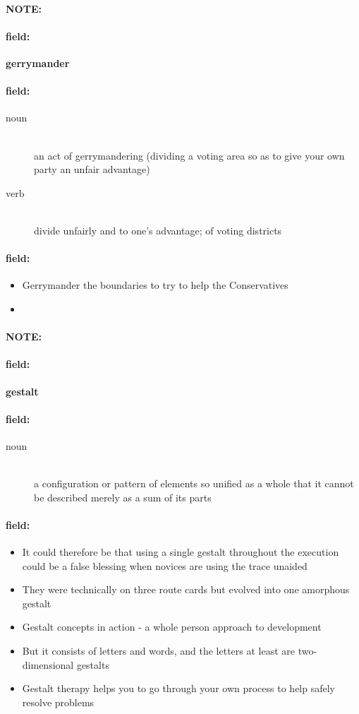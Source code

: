 \documentclass[12pt]{article}
\newenvironment{note}{\paragraph{NOTE:}}{}
\newenvironment{field}{\paragraph{field:}}{}
\begin{document}
\begin{note}
\begin{field}
\textbf{\large gerrymander}
\end{field}


\begin{field}
\begin{description}
\item[noun] \hfill \\ 
an act of gerrymandering (dividing a voting area so as to give your own party an unfair advantage)

\item[verb] \hfill \\ 
divide unfairly and to one's advantage; of voting districts

\end{description}
\end{field}

\begin{field}
\begin{itemize}
\item Gerrymander the boundaries to try to help the Conservatives
\item 
\end{itemize}
\end{field}
\end{note}
\begin{note}
\begin{field}
\textbf{\large gestalt}
\end{field}


\begin{field}
\begin{description}
\item[noun] \hfill \\ 
a configuration or pattern of elements so unified as a whole that it cannot be described merely as a sum of its parts

\end{description}
\end{field}

\begin{field}
\begin{itemize}
\item It could therefore be that using a single gestalt throughout the execution could be a false blessing when novices are using the trace unaided
\item They were technically on three route cards but evolved into one amorphous gestalt
\item Gestalt concepts in action - a whole person approach to development
\item But it consists of letters and words, and the letters at least are two-dimensional gestalts
\item Gestalt therapy helps you to go through your own process to help safely resolve problems
\end{itemize}
\end{field}
\end{note}
\end{document}
